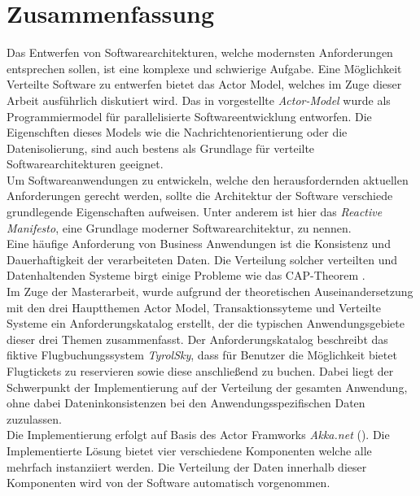 \chapter*{Zusammenfassung}
Das Entwerfen von Softwarearchitekturen, welche modernsten Anforderungen entsprechen sollen, ist eine komplexe und schwierige Aufgabe. Eine Möglichkeit Verteilte Software zu entwerfen bietet das Actor Model, welches im Zuge dieser Arbeit ausführlich diskutiert wird. Das in \cite{Hewitt1973AIntelligence} vorgestellte \textit{Actor-Model} wurde als Programmiermodel für parallelisierte Softwareentwicklung entworfen. Die Eigenschften dieses Models wie die Nachrichtenorientierung oder die Datenisolierung, sind auch bestens als Grundlage für verteilte Softwarearchitekturen geeignet. \\
Um Softwareanwendungen zu entwickeln, welche den herausfordernden aktuellen Anforderungen gerecht werden, sollte die Architektur der Software verschiede grundlegende Eigenschaften aufweisen. Unter anderem ist hier das \textit{Reactive Manifesto}, eine Grundlage moderner Softwarearchitektur, zu nennen. \\
Eine häufige Anforderung von Business Anwendungen ist die Konsistenz und Dauerhaftigkeit der verarbeiteten Daten. Die Verteilung solcher verteilten und Datenhaltenden Systeme birgt einige Probleme wie das CAP-Theorem \citep{gilbertPerspectiveCAPTheorem2012}. \\
Im Zuge der Masterarbeit, wurde aufgrund der theoretischen Auseinandersetzung mit den drei Hauptthemen Actor Model, Transaktionssyteme und Verteilte Systeme ein Anforderungskatalog erstellt, der die typischen Anwendungsgebiete dieser drei Themen zusammenfasst. Der Anforderungskatalog beschreibt das fiktive Flugbuchungssystem \textit{TyrolSky}, dass für Benutzer die Möglichkeit bietet Flugtickets zu reservieren sowie diese anschließend zu buchen. Dabei liegt der Schwerpunkt der Implementierung auf der Verteilung der gesamten Anwendung, ohne dabei Dateninkonsistenzen bei den Anwendungsspezifischen Daten zuzulassen. \\
Die Implementierung erfolgt auf Basis des Actor Framworks \textit{Akka.net} (\cite{Akka.netCommunityAkka.NETDocumentation}). Die Implementierte Lösung bietet vier verschiedene Komponenten welche alle mehrfach instanziiert werden. Die Verteilung der Daten innerhalb dieser Komponenten wird von der Software automatisch vorgenommen.

\cleardoublepage
